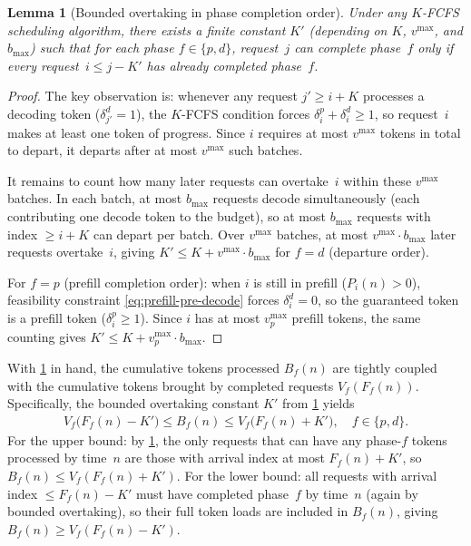 \documentclass[11pt]{article}
\theoremstyle{plain}
\newtheorem{lemma}[theorem]{Lemma}
\theoremstyle{definition}
\theoremstyle{remark}
\begin{document}
\begin{lemma}[Bounded overtaking in phase completion order]\label{lem:bounded-overtaking}
Under any $K$-FCFS scheduling algorithm, there exists a finite constant $K'$ (depending on $K$, $v^{\max}$, and $b_{\max}$) such that for each phase $f\in\{p,d\}$, request~$j$ can complete phase~$f$ only if every request~$i\le j-K'$ has already completed phase~$f$.
\end{lemma}
\begin{proof}
The key observation is: whenever any request $j'\ge i+K$ processes a decoding token ($\delta_{j'}^d=1$), the $K$-FCFS condition forces $\delta_i^p+\delta_i^d\ge 1$, so request~$i$ makes at least one token of progress. Since $i$ requires at most $v^{\max}$ tokens in total to depart, it departs after at most $v^{\max}$ such batches.

It remains to count how many later requests can overtake~$i$ within these $v^{\max}$ batches. In each batch, at most $b_{\max}$ requests decode simultaneously (each contributing one decode token to the budget), so at most $b_{\max}$ requests with index $\ge i+K$ can depart per batch. Over $v^{\max}$ batches, at most $v^{\max}\cdot b_{\max}$ later requests overtake~$i$, giving $K'\le K+v^{\max}\cdot b_{\max}$ for $f=d$ (departure order).

For $f=p$ (prefill completion order): when $i$ is still in prefill ($P_i(n)>0$), feasibility constraint \cref{eq:prefill-pre-decode} forces $\delta_i^d=0$, so the guaranteed token is a prefill token ($\delta_i^p\ge 1$). Since $i$ has at most $v_p^{\max}$ prefill tokens, the same counting gives $K'\le K+v_p^{\max}\cdot b_{\max}$.
\end{proof}

With \cref{lem:bounded-overtaking} in hand, the cumulative tokens processed $B_f(n)$ are tightly coupled with the cumulative tokens brought by completed requests $V_f(F_f(n))$. Specifically, the bounded overtaking constant $K'$ from \cref{lem:bounded-overtaking} yields
\begin{align}\label{eq:FCFS}
    V_f\big(F_f(n)-K'\big) \le B_f(n) \le V_f\big(F_f(n)+K'\big), \quad f\in \{p, d\}.
\end{align}
For the upper bound: by \cref{lem:bounded-overtaking}, the only requests that can have any phase-$f$ tokens processed by time~$n$ are those with arrival index at most $F_f(n)+K'$, so $B_f(n)\le V_f(F_f(n)+K')$. For the lower bound: all requests with arrival index $\le F_f(n)-K'$ must have completed phase~$f$ by time~$n$ (again by bounded overtaking), so their full token loads are included in $B_f(n)$, giving $B_f(n)\ge V_f(F_f(n)-K')$.
\end{document}
